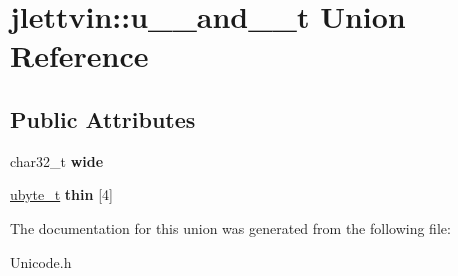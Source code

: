 \hypertarget{unionjlettvin_1_1u__32__and__8__t}{}\section{jlettvin\+:\+:u\+\_\+\_\+and\+\_\+\_\+t Union Reference}
\label{unionjlettvin_1_1u__32__and__8__t}
\subsection*{Public Attributes}
\begin{DoxyCompactItemize}
\item 
\hypertarget{unionjlettvin_1_1u__32__and__8__t_aea84e0b6f12e59b736e7aaacbade0573}{}char32\+\_\+t {\bfseries wide}\label{unionjlettvin_1_1u__32__and__8__t_aea84e0b6f12e59b736e7aaacbade0573}

\item 
\hypertarget{unionjlettvin_1_1u__32__and__8__t_a62fe342a7a37a268c7afd47a9d2ff4f1}{}\hyperlink{namespacejlettvin_a7c7cf84f4fd67858c46a1077ed2e3ad4}{ubyte\+\_\+t} {\bfseries thin} \mbox{[}4\mbox{]}\label{unionjlettvin_1_1u__32__and__8__t_a62fe342a7a37a268c7afd47a9d2ff4f1}

\end{DoxyCompactItemize}


The documentation for this union was generated from the following file\+:\begin{DoxyCompactItemize}
\item 
Unicode.\+h\end{DoxyCompactItemize}
